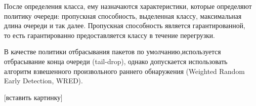 	После определения класса, ему назначаются характеристики, которые определяют
	политику очереди: пропускная способность, выделенная классу, максимальная
	длина очереди и так далее. Пропускная способность является гарантированной,
	то есть гарантированно предоставляется классу в течение перегрузки. 

	В качестве политики отбрасывания пакетов по умолчанию,используется отбрасывание конца
	очереди (tail-drop), однако допускается использовать
	алгоритм взвешенного произвольного раннего обнаружения (Weighted Random Early Detection, WRED).

	
    [вставить картинку]




